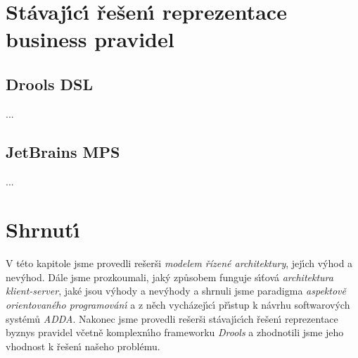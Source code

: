 \section{Stávaj\'{\i}c\'{\i} řešen\'{\i} reprezentace business pravidel}

\subsection{Drools DSL}


...

\subsection{JetBrains MPS}


...

\section{Shrnut\'{\i}}

V této kapitole jsme provedli rešerši \textit{modelem řízené architektury},
jej\'{\i}ch v\'yhod a nev\'yhod. Dále jsme prozkoumali, jak\'y způsobem funguje
s\'{\i}ťová \textit{architektura klient-server}, jaké jsou v\'yhody a nev\'yhody
a shrnuli jsme paradigma \textit{aspektově orientovaného programován\'{\i}} a
z něch vycházej\'{\i}c\'{\i} př\'{\i}stup k návrhu softwarov\'ych systémů \textit{ADDA}.
Nakonec jsme provedli rešerši stávaj\'{\i}c\'{\i}ch řešen\'{\i} reprezentace byznys pravidel
včetně komplexn\'{\i}ho frameworku \textit{Drools} a zhodnotili jsme jeho vhodnost
k řešen\'{\i} našeho problému. %
